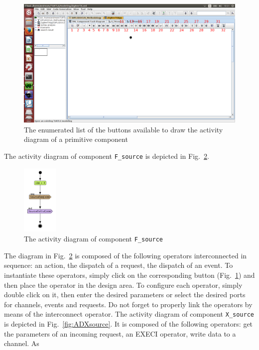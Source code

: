 \documentclass{llncs}
\newcommand{\screenshotsize}{1.0\textwidth}
\begin{document}
\begin{figure}[!htbp]
	\centering
	\includegraphics[width=\screenshotsize]{figures/screenshot/DWindow1.png}
	\caption{The enumerated list of the buttons available to draw the activity diagram of a primitive component}
	\label{fig:DWindow1}
\end{figure}
%
The activity diagram of component \texttt{F\_source} is depicted in Fig.~\ref{fig:ADFsource}.
%
\begin{figure}[!htbp]
	\centering
	\includegraphics[width=0.15\textwidth]{figures/screenshot/ADFsource.png}
	\caption{The activity diagram of component \texttt{F\_source}}
	\label{fig:ADFsource}
\end{figure}
%
The diagram in Fig.~\ref{fig:ADFsource} is composed of the following operators interconnected in sequence: an action,
the dispatch of a request, the dispatch of an event. To instantiate these operators, simply click on the corresponding
button (Fig.~\ref{fig:DWindow1}) and then place the operator in the design area. To configure each operator, simply
double click on it, then enter the desired parameters or select the desired ports for channels, events and requests. Do
not forget to properly link the operators by means of the interconnect operator. 
%
The activity diagram of component \texttt{X\_source} is depicted in Fig.~\ref{fig:ADXsource}. It is composed of the
following operators: get the parameters of an incoming request, an EXECI operator, write data to a channel. As
\end{document}
